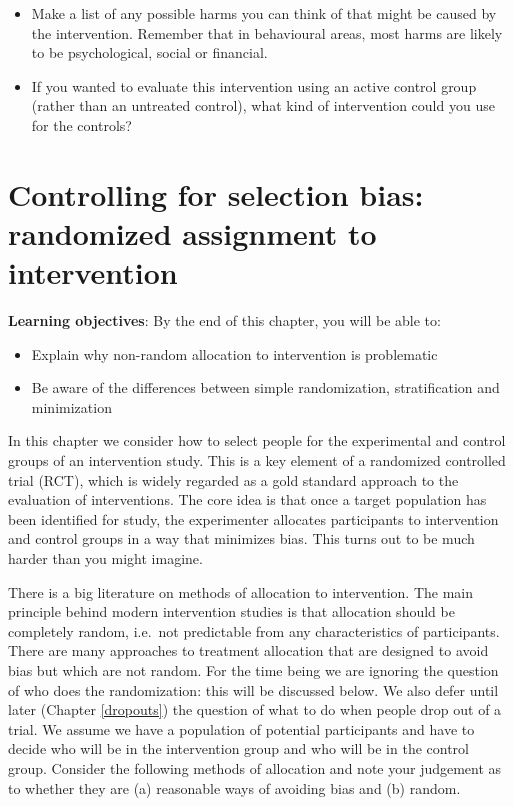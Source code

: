 \documentclass{krantz}
\providecommand{\tightlist}{%
\setlength{\itemsep}{0pt}\setlength{\parskip}{0pt}}
\begin{document}
\begin{itemize}
\tightlist
\item
  Make a list of any possible harms you can think of that might be caused by the intervention. Remember that in behavioural areas, most harms are likely to be psychological, social or financial.
\item
  If you wanted to evaluate this intervention using an active control group (rather than an untreated control), what kind of intervention could you use for the controls?
\end{itemize}

\hypertarget{randomize}{%
\chapter{Controlling for selection bias: randomized assignment to intervention}\label{randomize}}

\textbf{Learning objectives}: By the end of this chapter, you will be able to:

\begin{itemize}
\item
  Explain why non-random allocation to intervention is problematic
\item
  Be aware of the differences between simple randomization, stratification and minimization
\end{itemize}

In this chapter we consider how to select people for the experimental and control groups of an intervention study. This is a key element of a randomized controlled trial (RCT), which is widely regarded as a gold standard approach to the evaluation of interventions. The core idea is that once a target population has been identified for study, the experimenter allocates participants to intervention and control groups in a way that minimizes bias. This turns out to be much harder than you might imagine.

There is a big literature on methods of allocation to intervention. The main principle behind modern intervention studies is that allocation should be completely random, i.e.~not predictable from any characteristics of participants. There are many approaches to treatment allocation that are designed to avoid bias but which are not random. For the time being we are ignoring the question of who does the randomization: this will be discussed below. We also defer until later (Chapter \ref{dropouts}) the question of what to do when people drop out of a trial. We assume we have a population of potential participants and have to decide who will be in the intervention group and who will be in the control group. Consider the following methods of allocation and note your judgement as to whether they are (a) reasonable ways of avoiding bias and (b) random.
\end{document}

